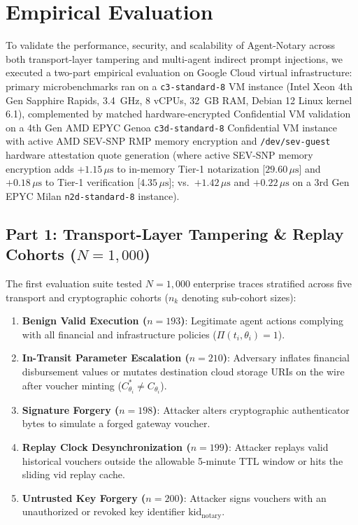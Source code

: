 \documentclass[conference,10pt]{IEEEtran}
\begin{document}
\section{Empirical Evaluation}
To validate the performance, security, and scalability of Agent-Notary across both transport-layer tampering and multi-agent indirect prompt injections, we executed a two-part empirical evaluation on Google Cloud virtual infrastructure: primary microbenchmarks ran on a \texttt{c3-standard-8} VM instance (Intel Xeon 4th Gen Sapphire Rapids, 3.4~GHz, 8 vCPUs, 32~GB RAM, Debian 12 Linux kernel 6.1), complemented by matched hardware-encrypted Confidential VM validation on a 4th Gen AMD EPYC Genoa \texttt{c3d-standard-8} Confidential VM instance with active AMD SEV-SNP RMP memory encryption and \texttt{/dev/sev-guest} hardware attestation quote generation (where active SEV-SNP memory encryption adds $+1.15\,\mu\text{s}$ to in-memory Tier-1 notarization [$29.60\,\mu\text{s}$] and $+0.18\,\mu\text{s}$ to Tier-1 verification [$4.35\,\mu\text{s}$]; vs.\ $+1.42\,\mu\text{s}$ and $+0.22\,\mu\text{s}$ on a 3rd Gen EPYC Milan \texttt{n2d-standard-8} instance).

\subsection{Part 1: Transport-Layer Tampering \& Replay Cohorts (\texorpdfstring{$N = 1{,}000$}{N = 1,000})}
The first evaluation suite tested $N = 1{,}000$ enterprise traces stratified across five transport and cryptographic cohorts ($n_k$ denoting sub-cohort sizes):
\begin{enumerate}
    \item \textbf{Benign Valid Execution ($n = 193$)}: Legitimate agent actions complying with all financial and infrastructure policies ($\Pi(t_i, \theta_i) = 1$).
    \item \textbf{In-Transit Parameter Escalation ($n = 210$)}: Adversary inflates financial disbursement values or mutates destination cloud storage URIs on the wire after voucher minting ($C_{\theta_i}^* \neq C_{\theta_i}$).
    \item \textbf{Signature Forgery ($n = 198$)}: Attacker alters cryptographic authenticator bytes to simulate a forged gateway voucher.
    \item \textbf{Replay Clock Desynchronization ($n = 199$)}: Attacker replays valid historical vouchers outside the allowable 5-minute TTL window or hits the sliding $\text{vid}$ replay cache.
    \item \textbf{Untrusted Key Forgery ($n = 200$)}: Attacker signs vouchers with an unauthorized or revoked key identifier $\text{kid}_{\text{notary}}$.
\end{enumerate}
\end{document}
